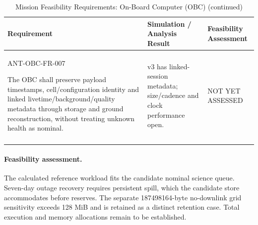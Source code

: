 \begin{table}[H]\centering\small\setlength{\tabcolsep}{3pt}
\ContinuedFloat\captionsetup{list=no}
\caption{Mission Feasibility Requirements: On-Board Computer (OBC) (continued)}
\begin{tabular}{@{}
>{\RaggedRight\arraybackslash}p{}
>{\RaggedRight\arraybackslash}p{}
>{\RaggedRight\arraybackslash}p{}
@{}}
\toprule Requirement & Simulation / Analysis Result & Feasibility Assessment\\\midrule
{}\label{req:ANT-OBC-FR-007}\mbox{ANT-OBC-}\newline\mbox{FR-007}\par The OBC shall preserve payload timestamps, cell/configuration identity and linked livetime/background/quality metadata through storage and ground reconstruction, without treating unknown health as nominal. & v3 has linked-session metadata; size/cadence and clock performance open. & NOT YET ASSESSED\\
\addlinespace[3pt]
\bottomrule
\end{tabular}
\end{table}
\paragraph{Feasibility assessment.} The calculated reference workload fits the candidate nominal science queue. Seven-day outage recovery requires persistent spill, which the candidate store accommodates before reserves. The separate 187498164-byte no-downlink grid sensitivity exceeds 128 MiB and is retained as a distinct retention case. Total execution and memory allocations remain to be established.
